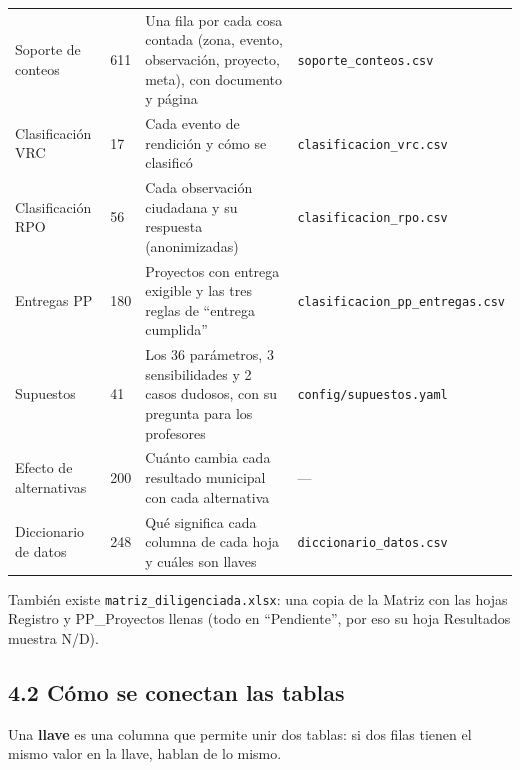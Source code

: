 \documentclass[11pt,letterpaper]{article}
\begin{document}
{\begin{xltabular}{\linewidth}{L{3.35cm}L{1.47cm}L{5.73cm}L{5.15cm}}
Soporte de conteos & 611 & Una fila por cada cosa contada (zona, evento, observación, proyecto, meta), con documento y página & \texttt{soporte\_\allowbreak{}conteos.\allowbreak{}csv} \\
Clasificación VRC & 17 & Cada evento de rendición y cómo se clasificó & \texttt{clasificacion\_\allowbreak{}vrc.\allowbreak{}csv} \\
Clasificación RPO & 56 & Cada observación ciudadana y su respuesta (anonimizadas) & \texttt{clasificacion\_\allowbreak{}rpo.\allowbreak{}csv} \\
Entregas PP & 180 & Proyectos con entrega exigible y las tres reglas de ``entrega cumplida'' & \texttt{clasificacion\_\allowbreak{}pp\_\allowbreak{}entregas.\allowbreak{}csv} \\
Supuestos & 41 & Los 36 parámetros, 3 sensibilidades y 2 casos dudosos, con su pregunta para los profesores & \texttt{config/\allowbreak{}supuestos.\allowbreak{}yaml} \\
Efecto de alternativas & 200 & Cuánto cambia cada resultado municipal con cada alternativa & --- \\
Diccionario de datos & 248 & Qué significa cada columna de cada hoja y cuáles son llaves & \texttt{diccionario\_\allowbreak{}datos.\allowbreak{}csv} \\
\end{xltabular}
}

También existe \texttt{\footnotesize matriz\_\allowbreak{}diligenciada.\allowbreak{}xlsx}: una copia de la Matriz con las hojas Registro y PP\_Proyectos llenas (todo en ``Pendiente'', por eso su hoja Resultados muestra N/D).

\subsection*{4.2 Cómo se conectan las tablas}


Una \textbf{llave} es una columna que permite unir dos tablas: si dos filas tienen el mismo valor en la llave, hablan de lo mismo.
\end{document}
